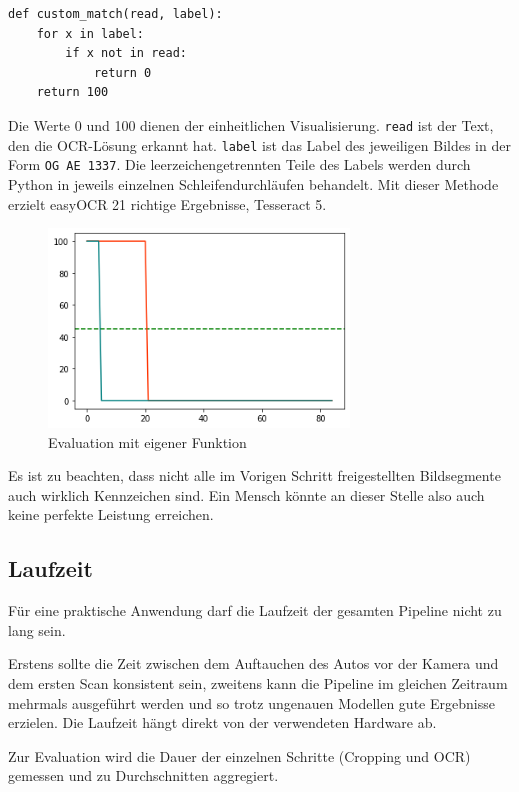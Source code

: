 \begin{lstlisting} 
def custom_match(read, label):	
	for x in label:
		if x not in read:
			return 0
	return 100
\end{lstlisting}     
Die Werte 0 und 100 dienen der einheitlichen Visualisierung. \lstinline{read} ist der Text, den die OCR-Lösung erkannt hat. \lstinline{label} ist das Label des jeweiligen Bildes in der Form \lstinline{OG AE 1337}. Die leerzeichengetrennten Teile des Labels werden durch Python in jeweils einzelnen Schleifendurchläufen behandelt.
Mit dieser Methode erzielt easyOCR 21 richtige Ergebnisse, Tesseract 5.
\begin{figure}[H]
		\centering
	\includegraphics[width=8cm]{./img/evaluation_custom_matcher.png}
	\caption{Evaluation mit eigener Funktion}
\end{figure}


Es ist zu beachten, dass nicht alle im Vorigen Schritt freigestellten Bildsegmente auch wirklich Kennzeichen sind. Ein Mensch könnte an dieser Stelle also auch keine perfekte Leistung erreichen. 

\subsection{Laufzeit}

Für eine praktische Anwendung darf die Laufzeit der gesamten Pipeline nicht zu lang sein.

Erstens sollte die Zeit zwischen dem Auftauchen des Autos vor der Kamera und dem ersten Scan konsistent sein,
zweitens kann die Pipeline im gleichen Zeitraum mehrmals ausgeführt werden und so trotz ungenauen Modellen gute Ergebnisse erzielen.
Die Laufzeit hängt direkt von der verwendeten Hardware ab.

Zur Evaluation wird die Dauer der einzelnen Schritte (Cropping und OCR) gemessen und zu Durchschnitten aggregiert. 

